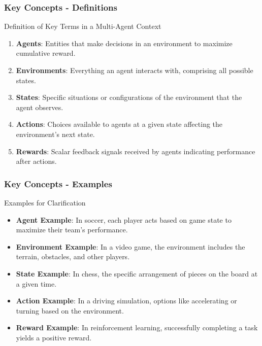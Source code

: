 \documentclass[aspectratio=169]{beamer}
\begin{document}
\begin{frame}[fragile]
    \frametitle{Key Concepts - Definitions}
    \begin{block}{Definition of Key Terms in a Multi-Agent Context}
        \begin{enumerate}
            \item \textbf{Agents}: Entities that make decisions in an environment to maximize cumulative reward.
            \item \textbf{Environments}: Everything an agent interacts with, comprising all possible states.
            \item \textbf{States}: Specific situations or configurations of the environment that the agent observes.
            \item \textbf{Actions}: Choices available to agents at a given state affecting the environment's next state.
            \item \textbf{Rewards}: Scalar feedback signals received by agents indicating performance after actions.
        \end{enumerate}
    \end{block}
\end{frame}

\begin{frame}[fragile]
    \frametitle{Key Concepts - Examples}
    \begin{block}{Examples for Clarification}
        \begin{itemize}
            \item \textbf{Agent Example}: In soccer, each player acts based on game state to maximize their team's performance.
            \item \textbf{Environment Example}: In a video game, the environment includes the terrain, obstacles, and other players.
            \item \textbf{State Example}: In chess, the specific arrangement of pieces on the board at a given time.
            \item \textbf{Action Example}: In a driving simulation, options like accelerating or turning based on the environment.
            \item \textbf{Reward Example}: In reinforcement learning, successfully completing a task yields a positive reward.
        \end{itemize}
    \end{block}
\end{frame}
\end{document}
